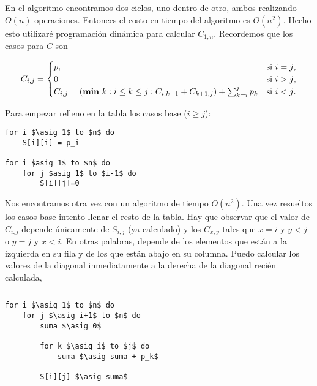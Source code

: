 \documentclass{article}
\newcommand{\asig}{\ensuremath{\leftarrow}}
\begin{document}
En el algoritmo encontramos dos ciclos, uno dentro de otro, ambos realizando $O(n)$ operaciones. Entonces
el costo en tiempo del algoritmo es $O(n^2)$. Hecho esto utilizaré programación dinámica para calcular
$C_{1,n}$. Recordemos que los casos para $C$ son

\begin{equation*}
C_{i,j} = 
\begin{cases}
p_i & \text{si $i=j$,} \\
0 &\text{si $i>j$,} \\
C_{i,j} = (\text{{\bf min} } k : i \leq k \leq j : C_{i,k-1} + C_{k+1,j}) + \sum_{k=i}^j p_k &\text{si $i<j$.} \\
\end{cases}
\end{equation*}

Para empezar relleno en la tabla los casos base ($i \geq j$):

\begin{lstlisting}[caption={Inicialización de casos base de la tabla C},label=alg:tablaC_base]
for i $\asig 1$ to $n$ do
    S[i][i] = p_i

for i $asig 1$ to $n$ do
    for j $asig 1$ to $i-1$ do
        S[i][j]=0
\end{lstlisting}

Nos encontramos otra vez con un algoritmo de tiempo $O(n^2)$. Una vez resueltos los
casos base intento llenar el resto de la tabla. Hay que observar que el valor de $C_{i,j}$
depende únicamente de $S_{i,j}$ (ya calculado) y los $C_{x,y}$ tales que $x=i$ y $y<j$ o
$y=j$ y $x<i$. En otras palabras, depende de los elementos que están a la izquierda en su
fila y de los que están abajo en su columna. Puedo calcular los valores de la diagonal inmediatamente
a la derecha de la diagonal recién calculada,


\begin{lstlisting}[caption={Cálculo de la tabla C},label=alg:tablaC]

\end{lstlisting}

\begin{lstlisting}[caption={Cálculo del árbol},label=alg:arbol]
for i $\asig 1$ to $n$ do
    for j $\asig i+1$ to $n$ do
        suma $\asig 0$

        for k $\asig i$ to $j$ do
            suma $\asig suma + p_k$

        S[i][j] $\asig suma$
\end{lstlisting}
\end{document}
